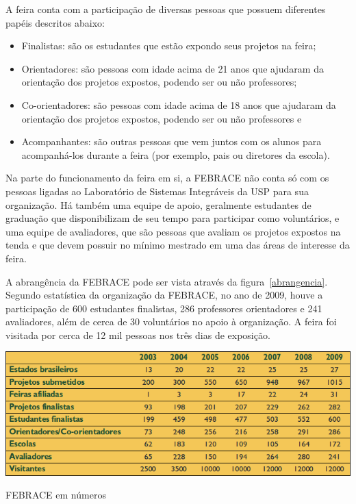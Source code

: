  A feira conta com a participação de diversas pessoas que possuem diferentes papéis descritos abaixo:

  \begin{itemize}
    \item{
      Finalistas: são os estudantes que estão expondo seus projetos na feira;
    }
    \item{
		Orientadores: são pessoas com idade acima de 21 anos que ajudaram da orientação dos projetos expostos, podendo ser ou não professores;
    }
    \item{
		Co-orientadores: são pessoas com idade acima de 18 anos que ajudaram da orientação dos projetos expostos, podendo ser ou não professores e
    }
    \item{
		Acompanhantes: são outras pessoas que vem juntos com os alunos para acompanhá-los durante a feira (por exemplo, pais ou diretores da escola).
    }
  \end{itemize}

 Na parte do funcionamento da feira em si, a FEBRACE não conta só com os pessoas ligadas ao Laboratório de Sistemas Integráveis da USP para sua organização. Há também uma equipe de apoio, geralmente estudantes de graduação que disponibilizam de seu tempo para participar como voluntários, e uma equipe de avaliadores, que são pessoas que avaliam os projetos expostos na tenda e que devem possuir no mínimo mestrado em uma das áreas de interesse da feira.

 A abrangência da FEBRACE pode ser vista através da figura~\ref{abrangencia}. Segundo estatística da organização da FEBRACE, no ano de 2009, houve a participação de 600 estudantes finalistas, 286 professores orientadores e 241 avaliadores, além de cerca de 30 voluntários no apoio à organização. A feira foi visitada por cerca de 12 mil pessoas nos três dias de exposição. 

    \begin{table}
        \begin{center}
    \includegraphics[width=0.8\linewidth]{arquivos/abrangencia.png}
        \end{center}
        \caption{FEBRACE em números}
        \label{abrangencia}
    \end{table}


